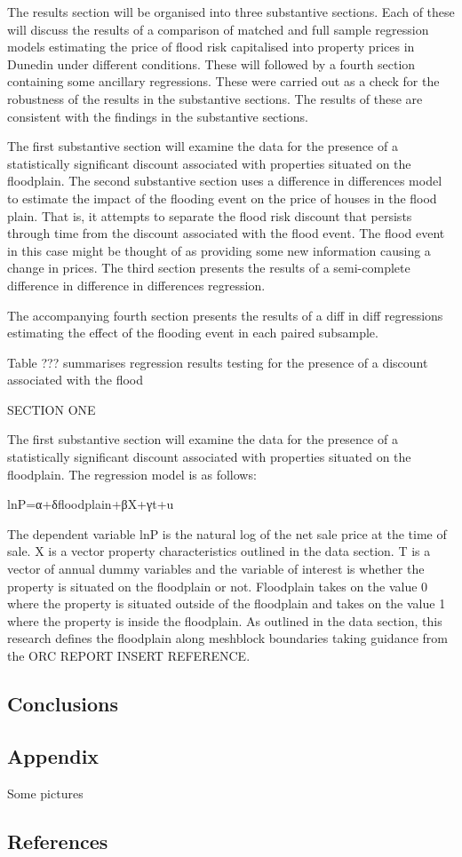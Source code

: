 \documentclass[]{article}
\begin{document}
The results section will be organised into three substantive sections.
Each of these will discuss the results of a comparison of matched and
full sample regression models estimating the price of flood risk
capitalised into property prices in Dunedin under different conditions.
These will followed by a fourth section containing some ancillary
regressions. These were carried out as a check for the robustness of the
results in the substantive sections. The results of these are consistent
with the findings in the substantive sections.

The first substantive section will examine the data for the presence of
a statistically significant discount associated with properties situated
on the floodplain. The second substantive section uses a difference in
differences model to estimate the impact of the flooding event on the
price of houses in the flood plain. That is, it attempts to separate the
flood risk discount that persists through time from the discount
associated with the flood event. The flood event in this case might be
thought of as providing some new information causing a change in prices.
The third section presents the results of a semi-complete difference in
difference in differences regression.

The accompanying fourth section presents the results of a diff in diff
regressions estimating the effect of the flooding event in each paired
subsample.

Table ??? summarises regression results testing for the presence of a
discount associated with the flood

SECTION ONE

The first substantive section will examine the data for the presence of
a statistically significant discount associated with properties situated
on the floodplain. The regression model is as follows:

lnP=α+δfloodplain+βX+γt+u

The dependent variable lnP is the natural log of the net sale price at
the time of sale. X is a vector property characteristics outlined in the
data section. T is a vector of annual dummy variables and the variable
of interest is whether the property is situated on the floodplain or
not. Floodplain takes on the value 0 where the property is situated
outside of the floodplain and takes on the value 1 where the property is
inside the floodplain. As outlined in the data section, this research
defines the floodplain along meshblock boundaries taking guidance from
the ORC REPORT INSERT REFERENCE.

\subsection{Conclusions}\label{conclusions}

\subsection{Appendix}\label{appendix}

Some pictures

\subsection{References}\label{references}
\end{document}
